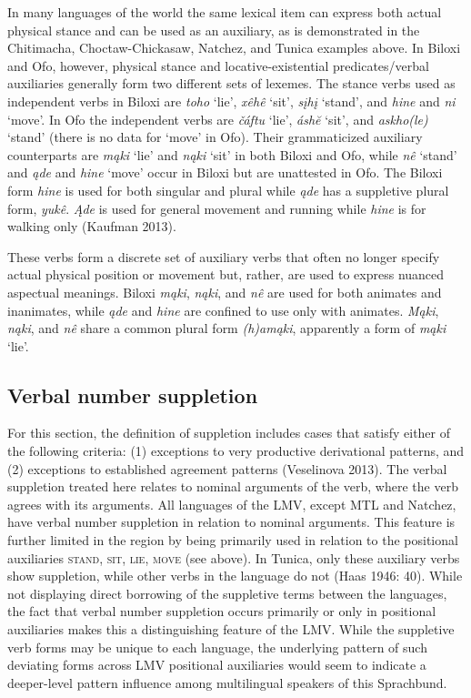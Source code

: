 \documentclass[output=paper]{LSP/langsci}
\begin{document}
In many languages of the world the same lexical item can express both actual physical stance and can be used as an auxiliary, as is demonstrated in the Chitimacha, Choctaw-Chickasaw, Natchez, and Tunica examples above. In Biloxi and Ofo, however, physical stance and locative-existential predicates/verbal auxiliaries generally form two different sets of lexemes. The stance verbs used as independent verbs in Biloxi are \emph{toho} `lie', \emph{xêhê} `sit', \emph{sįhį} `stand', and \emph{hine} and \emph{ni} `move'. In Ofo the independent verbs are \emph{čáftu} `lie', \emph{áshĕ} `sit', and \emph{askho(le)} `stand' (there is no data for `move' in Ofo). Their grammaticized auxiliary counterparts are \emph{mąki} `lie' and \emph{nąki} `sit' in both Biloxi and Ofo, while \emph{nê} `stand' and \emph{ąde} and \emph{hine} `move' occur in Biloxi but are unattested in Ofo. The Biloxi form \emph{hine} is used for both singular and plural while \emph{ąde} has a suppletive plural form, \emph{yukê}. \emph{Ąde} is used for general movement and running while \emph{hine} is for walking only (Kaufman 2013). 

These verbs form a discrete set of auxiliary verbs that often no longer specify actual physical position or movement but, rather, are used to express nuanced aspectual meanings. Biloxi \emph{mąki}, \emph{nąki}, and \emph{nê} are used for both animates and inanimates, while \emph{ąde} and \emph{hine} are confined to use only with animates. \emph{Mąki}, \emph{nąki}, and \emph{nê} share a common plural form \emph{(h)amąki}, apparently a form of \emph{mąki} `lie'. 
 
\subsection{Verbal number suppletion}

	For this section, the definition of suppletion includes cases that satisfy either of the following criteria: (1) exceptions to very productive derivational patterns, and (2) exceptions to established agreement patterns (Veselinova 2013). The verbal suppletion treated here relates to nominal arguments of the verb, where the verb agrees with its arguments. All languages of the LMV, except MTL and Natchez, have verbal number suppletion in relation to nominal arguments. This feature is further limited in the region by being primarily used in relation to the positional auxiliaries \textsc{stand}, \textsc{sit}, \textsc{lie}, \textsc{move} (see above). In Tunica, only these auxiliary verbs show suppletion, while other verbs in the language do not (Haas 1946: 40). While not displaying direct borrowing of the suppletive terms between the languages, the fact that verbal number suppletion occurs primarily or only in positional auxiliaries makes this a distinguishing feature of the LMV. While the suppletive verb forms may be unique to each language, the underlying pattern of such deviating forms across LMV positional auxiliaries would seem to indicate a deeper-level pattern influence among multilingual speakers of this Sprachbund.
\end{document}
